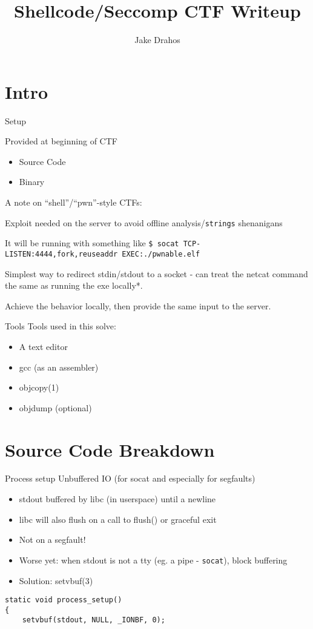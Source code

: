\documentclass{beamer}
\title{Shellcode/Seccomp CTF Writeup}
\author{Jake Drahos}
\begin{document}
\section{Intro}

\begin{frame}
{Setup}

Provided at beginning of CTF
\begin{itemize}
 \item Source Code
 \item Binary
\end{itemize}
\end{frame}

\begin{frame}
  A note on ``shell''/``pwn''-style CTFs:
  
  \pause
  Exploit needed on the server to avoid offline 
  analysis/{\tt strings} shenanigans
  
  It will be running with something like 
  {\tt \$ socat TCP-LISTEN:4444,fork,reuseaddr EXEC:./pwnable.elf }
  
  Simplest way to redirect stdin/stdout to a socket - can treat the 
  netcat command the same as running the exe locally*.
  
  Achieve the behavior locally, then provide the same input to the server.
  
\end{frame}

\begin{frame}
{Tools}
Tools used in this solve:
\begin{itemize}
 \item A text editor
 \item gcc (as an assembler)
 \item objcopy(1)
 \item objdump (optional)
\end{itemize}
\end{frame}

\section{Source Code Breakdown}

\begin{frame}[fragile]
{Process setup}
Unbuffered IO (for socat and especially for segfaults)

\begin{itemize}
 \item stdout buffered by libc (in userspace) until a newline
 \item libc will also flush on a call to flush() or graceful exit
 \item Not on a segfault!
 \item Worse yet: when stdout is not a tty (eg. a pipe - {\tt socat}), block buffering
 \item Solution: setvbuf(3)
\end{itemize}


    \begin{lstlisting}[firstnumber=41]
static void process_setup()
{
    setvbuf(stdout, NULL, _IONBF, 0);
    \end{lstlisting}
\end{frame}
\end{document}

